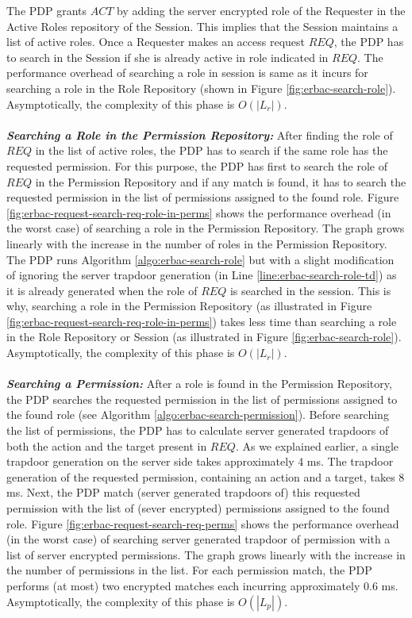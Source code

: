 \documentclass[epsfig,a4paper,11pt,titlepage]{book}
\numberwithin{algorithm}{chapter}
\begin{document}
The \gls{PDP} grants $\mathit{ACT}$ by adding the server encrypted role of the Requester in the Active Roles repository of the Session. This implies that the Session maintains a list of active roles. Once a Requester makes an access request $\mathit{REQ}$, the \gls{PDP} has to search in the Session if she is already active in role indicated in $\mathit{REQ}$. The performance overhead of searching a role in session is same as it incurs for searching a role in the Role Repository (shown in Figure \ref{fig:erbac-search-role}). Asymptotically, the complexity of this phase is $O(| L_r |)$. \\ \\
\noindent \emph{\textbf{Searching a Role in the Permission Repository:}}
After finding the role of $\mathit{REQ}$ in the list of active roles, the \gls{PDP} has to search if the same role has the requested permission. For this purpose, the \gls{PDP} has first to search the role of $\mathit{REQ}$ in the Permission Repository and if any match is found, it has to search the requested permission in the list of permissions assigned to the found role. Figure \ref{fig:erbac-request-search-req-role-in-perms} shows the performance overhead (in the worst case) of searching a role in the Permission Repository. The graph grows linearly with the increase in the number of roles in the Permission Repository. The \gls{PDP} runs Algorithm \ref{algo:erbac-search-role} but with a slight modification of ignoring the server trapdoor generation (in Line \ref{line:erbac-search-role-td}) as it is already generated when the role of $\mathit{REQ}$ is searched in the session. This is why, searching a role in the Permission Repository (as illustrated in Figure \ref{fig:erbac-request-search-req-role-in-perms}) takes less time than searching a role in the Role Repository or Session (as illustrated in Figure \ref{fig:erbac-search-role}). Asymptotically, the complexity of this phase is $O(| L_r |)$. \\ \\
\noindent \emph{\textbf{Searching a Permission:}}
After a role is found in the Permission Repository, the \gls{PDP} searches the requested permission in the list of permissions assigned to the found role (see Algorithm \ref{algo:erbac-search-permission}). Before searching the list of permissions, the \gls{PDP} has to calculate server generated trapdoors of both the action and the target present in $\mathit{REQ}$. As we explained earlier, a single trapdoor generation on the server side takes approximately 4 \gls{ms}. The trapdoor generation of the requested permission, containing an action and a target, takes 8 \gls{ms}. Next, the \gls{PDP} match (server generated trapdoors of) this requested permission with the list of (sever encrypted) permissions assigned to the found role. Figure \ref{fig:erbac-request-search-req-perms} shows the performance overhead (in the worst case) of searching server generated trapdoor of permission with a list of server encrypted permissions. The graph grows linearly with the increase in the number of permissions in the list. For each permission match, the \gls{PDP} performs (at most) two encrypted matches each incurring approximately 0.6 \gls{ms}. Asymptotically, the complexity of this phase is $O(| L_p |)$. \\ \\
\end{document}
